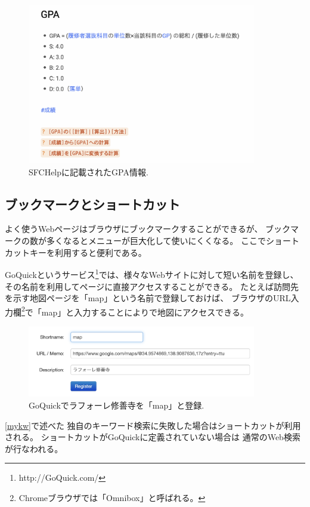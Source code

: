 \documentclass{ipsjprosym}
\begin{document}
\begin{figure}[h]
  \includegraphics[width=10cm,bb=0 0 1186 836]{figures/34e05297922fbd2133bf4011f97457b8.png}
  \caption{SFCHelpに記載されたGPA情報.}
  \label{GPA}
\end{figure}

\subsection{ブックマークとショートカット}
   
よく使うWebページはブラウザにブックマークすることができるが、
ブックマークの数が多くなるとメニューが巨大化して使いにくくなる。
ここでショートカットキーを利用すると便利である。

GoQuickというサービス\footnote{
  \textsf{http://GoQuick.com/}
}では、様々なWebサイトに対して短い名前を登録し、
その名前を利用してページに直接アクセスすることができる。
たとえば訪問先を示す地図ページを「map」という名前で登録しておけば、
ブラウザのURL入力欄\footnote{
 Chromeブラウザでは「Omnibox」と呼ばれる。
}で「map」と入力することによりで地図にアクセスできる。

\begin{figure}[h]
  \includegraphics[width=10cm,bb=0 0 1368 430]{figures/bc5239609c72ac3054e0b4469bb4c037.png}
  \caption{GoQuickでラフォーレ修善寺を「map」と登録.}
  \label{shuzenji}
\end{figure}

\ref{mykw}で述べた
独自のキーワード検索に失敗した場合はショートカットが利用される。
ショートカットがGoQuickに定義されていない場合は
通常のWeb検索が行なわれる。
\end{document}
